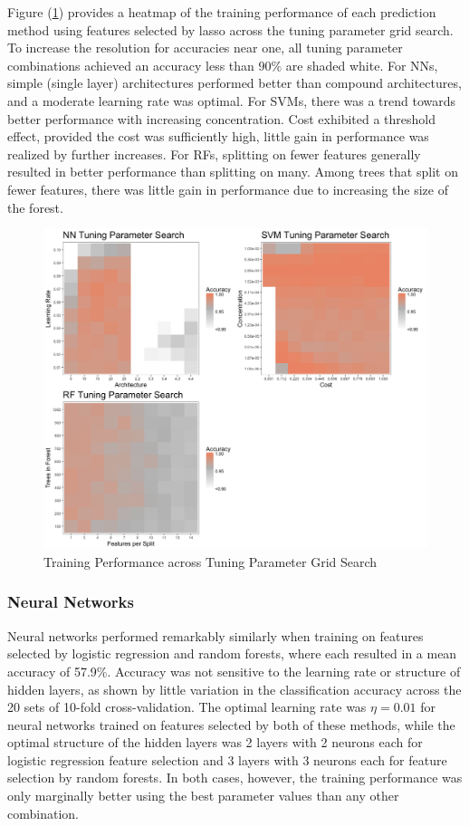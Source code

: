 \documentclass[a4paper]{article}
\begin{document}
Figure (\ref{fig:03}) provides a heatmap of the training performance of each prediction method using features selected by lasso across the tuning parameter grid search. To increase the resolution for accuracies near one, all tuning parameter combinations achieved an accuracy less than $90\%$ are shaded white. For NNs, simple (single layer) architectures performed better than compound architectures, and a moderate learning rate was optimal. For SVMs, there was a trend towards better performance with increasing concentration. Cost exhibited a threshold effect, provided the cost was sufficiently high, little gain in performance was realized by further increases. For RFs, splitting on fewer features generally resulted in better performance than splitting on many. Among trees that split on fewer features, there was little gain in performance due to increasing the size of the forest. 

\begin{figure}[h!]
\centering
\includegraphics[scale=0.35]{Fig03.png}
\caption{Training Performance across Tuning Parameter Grid Search}
\label{fig:03}
\end{figure}


\subsubsection{Neural Networks}
Neural networks performed remarkably similarly when training on features selected by logistic regression and random forests, where each resulted in a mean accuracy of 57.9\%. Accuracy was not sensitive to the learning rate or structure of hidden layers, as shown by little variation in the classification accuracy across the 20 sets of 10-fold cross-validation. The optimal learning rate was $\eta = 0.01$ for neural networks trained on features selected by both of these methods, while the optimal structure of the hidden layers was 2 layers with 2 neurons each for logistic regression feature selection and 3 layers with 3 neurons each for feature selection by random forests. In both cases, however, the training performance was only marginally better using the best parameter values than any other combination. 
\end{document}
